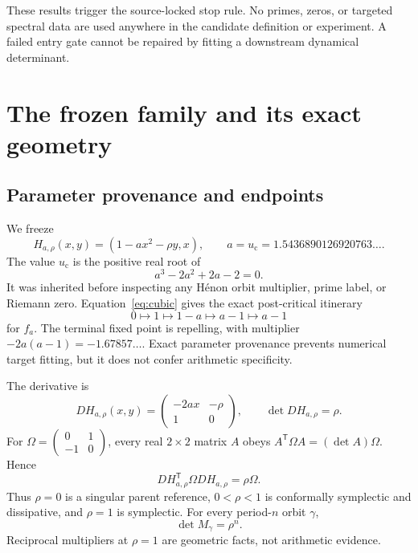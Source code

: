 \documentclass[11pt]{article}
\newcommand{\uc}{u_{\mathrm c}}
\newcommand{\Om}{\Omega}
\begin{document}
These results trigger the source-locked stop rule. No primes, zeros, or
targeted spectral data are used anywhere in the candidate definition or
experiment. A failed entry gate cannot be repaired by fitting a downstream
dynamical determinant.

\section{The frozen family and its exact geometry}
\label{sec:geometry}

\subsection{Parameter provenance and endpoints}

We freeze
\begin{equation}
 H_{a,\rho}(x,y)=(1-a x^2-\rho y,x),\qquad
 a=\uc=1.5436890126920763\ldots .
 \label{eq:map}
\end{equation}
The value \(\uc\) is the positive real root of
\begin{equation}
 a^3-2a^2+2a-2=0.
 \label{eq:cubic}
\end{equation}
It was inherited before inspecting any H\'enon orbit multiplier, prime label,
or Riemann zero. Equation~\eqref{eq:cubic} gives the exact post-critical
itinerary
\[
 0\mapsto1\mapsto1-a\mapsto a-1\mapsto a-1
\]
for \(f_a\). The terminal fixed point is repelling, with multiplier
\(-2a(a-1)=-1.67857\ldots\). Exact parameter provenance prevents numerical
target fitting, but it does not confer arithmetic specificity.

The derivative is
\begin{equation}
DH_{a,\rho}(x,y)=
\begin{pmatrix}
 -2ax & -\rho\\
 1 & 0
\end{pmatrix},
\qquad
\det DH_{a,\rho}=\rho .
\label{eq:jacobian}
\end{equation}
For \(\Om=\left(\begin{smallmatrix}0&1\\-1&0\end{smallmatrix}\right)\),
every real \(2\times2\) matrix \(A\) obeys
\(A^{\mathsf T}\Om A=(\det A)\Om\). Hence
\begin{equation}
 DH_{a,\rho}^{\mathsf T}\Om DH_{a,\rho}=\rho\Om.
\label{eq:conformal}
\end{equation}
Thus \(\rho=0\) is a singular parent reference,
\(0<\rho<1\) is conformally symplectic and dissipative, and \(\rho=1\)
is symplectic. For every period-\(n\) orbit \(\gamma\),
\begin{equation}
 \det M_\gamma=\rho^n.
\label{eq:monodromy}
\end{equation}
Reciprocal multipliers at \(\rho=1\) are geometric facts, not arithmetic
evidence.
\end{document}
